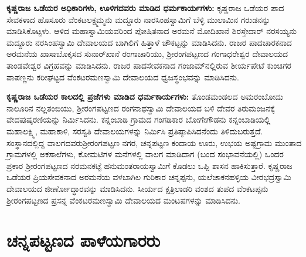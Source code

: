 \newpage

\textbf{ಕೃಷ್ಣರಾಜ ಒಡೆಯರ ಅಧಿಕಾರಿಗಳು, ಊಳಿಗದವರು ಮಾಡಿದ ಧರ್ಮಕಾರ್ಯಗಳು: } ಕೃಷ್ಣರಾಜ ಒಡೆಯರ ಪಾದ ಸೇವಕಳಾದ ಹೊಸೂರು ವೆಂಕಟಲಕ್ಷ್ಮಮ್ಮನು ಮದ್ದೂರು ನಾರಸಿಂಹಸ್ವಾಮಿಗೆ ಬೆಳ್ಳಿ ಮುಲಾಮಿನ ಗರುಡನನ್ನು ಮಾಡಿಸಿ\-ಕೊಟ್ಟಳು. ಆಳಿದ ಮಹಾಸ್ವಾಮಿಯವರಿಂದ ಪೋಷಿತನಾದ ಅರಮನೆ ಮೋದಿಖಾನೆ ಶಿರಸ್ತೇದಾರ್​ ನರಸಯ್ಯನು ಮದ್ದೂರು ನರಸಿಂಹಸ್ವಾಮಿ ದೇವಾಲಯದ ಬಾಗಿಲಿಗೆ ಹಿತ್ತಾಳೆ ಚೌಕಟ್ಟನ್ನು ಮಾಡಿಸಿದನು. ರಾಜರ ಪಾದಚಾರಕನಾದ ಅರಮನೆಯ ಖಾಸಾಬೊಕ್ಕಸದ ಸುನಾರ್​ಖಾನೆ ರಂಗಾಚಾರಿಯು, ಶ‍್ರೀರಂಗಪಟ್ಟಣದ ಗಂಗಾಧರೇಶ್ವರ ದೇವಾಲಯದ ತಾಂಡವೇಶ್ವರ ವಿಗ್ರಹವನ್ನು ಮಾಡಿಸಿದನು. ರಾಜರ ಪಾದಸೇವಕನಾದ ಗಂಜಾಮ್‌ನಲ್ಲಿರುವ ಶೀರ್ಯಪೇಟೆ ಕುಂಚಿಗರ ಪಾಪಣ್ಣನು ಕರೀಘಟ್ಟದ ವೆಂಕಟರಮಣಸ್ವಾಮಿ ದೇವಾಲಯದ ಧ್ವಜಸ್ಥಂಭವನ್ನು ಮಾಡಿಸಿದನು.

\textbf{ಕೃಷ್ಣರಾಜ ಒಡೆಯರ ಕಾಲದಲ್ಲಿ ಪ್ರಜೆಗಳು ಮಾಡಿದ ಧರ್ಮಕಾರ್ಯಗಳು: } ತೊಂಡಮಂಡಲದ ಅಮರಂಬೋದು ನಾಲೂರಿನ ನಲ್ಲತಂಬಿಯು, ಶ‍್ರೀರಂಗಪಟ್ಟಣದ ರಂಗನಾಥಸ್ವಾಮಿ ದೇವಾಲಯದ ಬಳಿ ದೇವರ ತಿರುಮಂಜನಕ್ಕೆ ವೇದಪುಷ್ಕರಣಿ\-ಯನ್ನು ನಿರ್ಮಿಸಿದನು. ಕನ್ನಂಬಾಡಿ ಗ್ರಾಮದ ಗಂಗಡಿಕಾರ ಬೋಗೇಗೌಡನು ಕನ್ನಂಬಾಡಿಯಲ್ಲಿ ಮಹಾಲಕ್ಷ್ಮಿ, ಮಹಾಕಾಳಿ, ಸರಸ್ವತಿ ದೇವಾಲಯಗಳನ್ನು ನಿರ್ಮಿಸಿ ಪ್ರತಿಷ್ಠಾಪಿಸಿದನೆಂದು ತಿಳಿದುಬರುತ್ತದೆ. ಸಂಸ್ಥಾನದಲ್ಲಿದ್ದ ವಾಲಗದವರು\break ಶ‍್ರೀರಂಗಪಟ್ಟಣ ನಗರ, ಚನ್ನಪಟ್ಟಣ ಕಂದಾಯ ಊರು, ಉಭಯ ಅಷ್ಟಗ್ರಾಮ ಮುಂತಾದ ಗ್ರಾಮಗಳಲ್ಲಿ ಅಕಸಾಲೆಗಳು, ಕೋಮಟಿಗಳ ಮನೆಗಳಲ್ಲಿ ವಾಲಗ ಮಾಡಿದಾಗ (ಬಂದ ಸಂಭಾವನೆಯಲ್ಲಿ) ಒಂದರ ಪ್ರಕಾರ ಶ‍್ರೀರಂಗಪಟ್ಟಣದ ನರಮನಕಟ್ಟೆ ಹನುಮಂತರಾಯಸ್ವಾಮಿಗೆ ಕೊಡಲು ಒಪ್ಪಿ ಶಾಸನ ಹಾಕಿಸುತ್ತಾರೆ. ಕೃಷ್ಣರಾಜ ಒಡೆಯರ ಪ್ರಿಯಸೇವಕನಾದ ಅರಮನೆಯ ವಳಬಾಗಿಲ ಗುರಿಕಾರ ಚನ್ನಪ್ಪನು, ಯಲೆಚಾಕನಹಳ್ಳಿಯ ವೀರಭದ್ರಸ್ವಾಮಿ ದೇವಾಲಯದ ಜೀರ್ಣೋದ್ಧಾರವನ್ನು ಮಾಡಿಸಿ\-ದನು. ಸೀರ್ಯದ ಕ್ಷತ್ರಿಲಾಡರಿ ವಂಶದ ತುಪದ ವೆಂಕಟಪ್ಪನು ಶ‍್ರೀರಂಗಪಟ್ಟಣದ ಪ್ರಸನ್ನ ವೆಂಕಟರಮಣಸ್ವಾಮಿ ದೇವಾಲಯದ ಮಂಟಪಗಳನ್ನು ಮಾಡಿಸಿದನು.


\section{ಚನ್ನಪಟ್ಟಣದ ಪಾಳೆಯಗಾರರು}

